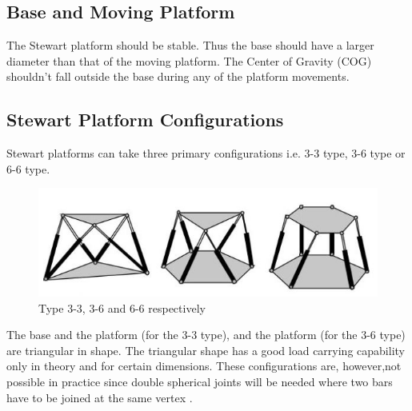 \subsection{Base and Moving Platform}
 The Stewart platform should be stable. Thus the base should have a larger diameter than that of the moving platform. The Center of Gravity (COG) shouldn't fall outside the base during any of the platform movements.
 \subsection{Stewart Platform Configurations}
Stewart platforms can take three primary configurations i.e. 3-3 type, 3-6 type or 6-6 type.
\begin{center}
	\begin{figure}[H]
	\centering
	\includegraphics{Figures/stewart}
	\caption[Configurations]{Type 3-3, 3-6 and 6-6 respectively
	\cite{fernandes_design_nodate}}
	\end{figure}
\end{center}
The base and the platform (for the 3-3 type), and the platform (for the 3-6 type) are triangular in shape. The triangular shape has a good load carrying capability only in theory and for certain dimensions. These configurations are, however,not possible in practice since double spherical joints will be needed where two bars have to be joined at the same vertex
\cite{fernandes_design_nodate}.

